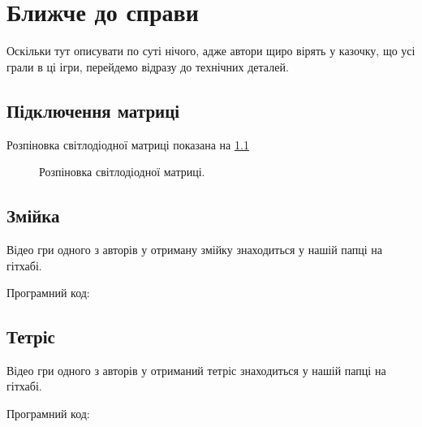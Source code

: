 \chapter{Ближче до справи} 
\label{chapter:first}

Оскільки тут описувати по суті нічого, адже автори щиро вірять у казочку, що усі грали в ці ігри, перейдемо відразу до технічних деталей.

\section{Підключення матриці}

Розпіновка світлодіодної матриці показана на \ref{matrix}
\begin{figure}[h]
\caption{Розпіновка світлодіодної матриці.}
\label{matrix}
\end{figure}

\section{Змійка}

Відео гри одного з авторів у отриману змійку знаходиться у нашій папці на гітхабі.

Програмний код: 



\section{Тетріс}

Відео гри одного з авторів у отриманий тетріс знаходиться у нашій папці на гітхабі.

Програмний код: 

